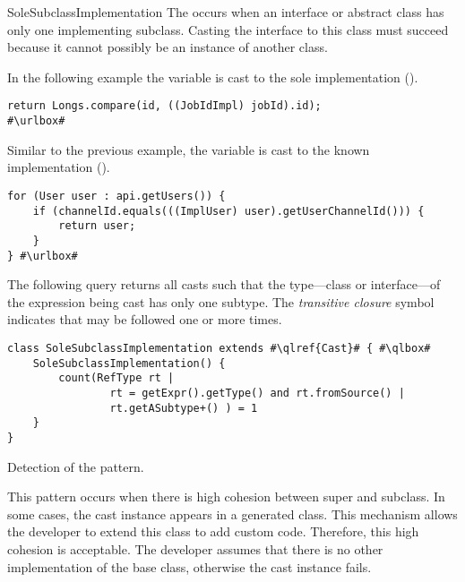 \begin{pattern}{SoleSubclassImplementation}
The \thisp{} occurs when an interface or abstract class has only one implementing subclass.
Casting the interface to this class must succeed because it cannot possibly be an instance of another class.

\instances{}
In the following example the 
variable is cast to the sole implementation ().

\def\urlvar{http://bit.ly/ow2_proactive_scheduling_2Ulcjfs}
\begin{verbatim}
return Longs.compare(id, ((JobIdImpl) jobId).id);
#\urlbox#
\end{verbatim}

Similar to the previous example,
the variable  is cast to the known implementation ().

\def\urlvar{http://bit.ly/Javacord_Javacord_2GwGjuV}
\begin{verbatim}
for (User user : api.getUsers()) {
    if (channelId.equals(((ImplUser) user).getUserChannelId())) {
        return user;
    }
} #\urlbox#
\end{verbatim}


\detection{}
The following query returns all casts such that the type---class or interface---of the expression being cast has only one subtype.
The \emph{transitive closure} symbol \code{+} indicates that  may be followed one or more times.

\begin{listing}
\begin{verbatim}
class SoleSubclassImplementation extends #\qlref{Cast}# { #\qlbox#
	SoleSubclassImplementation() {
		count(RefType rt | 
				rt = getExpr().getType() and rt.fromSource() | 
				rt.getASubtype+() ) = 1
	}
}
\end{verbatim}
\caption{Detection of the \thisp{} pattern.}
\label{lst:ql:SoleSubclassImplementationCast}
\end{listing}


\issues{}
This pattern occurs when there is high cohesion between super and subclass.
In some cases, the cast instance appears in a generated class.
This mechanism allows the developer to extend this class to add custom code.
Therefore, this high cohesion is acceptable.
The developer assumes that there is no other implementation of the base class,
otherwise the cast instance fails.

\end{pattern}
